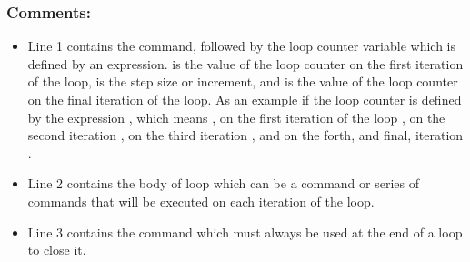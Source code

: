 \subsubsection{Comments:}
\begin{itemize}
\item Line 1 contains the  command, followed by the loop counter variable which is defined by an expression.  is the value of the loop counter on the first iteration of the loop,  is the step size or increment, and  is the value of the loop counter on the final iteration of the loop. As an example if the loop counter is defined by the expression , which means , on the first iteration of the loop , on the second iteration , on the third iteration , and on the forth, and final, iteration .
\item Line 2 contains the body of loop which can be a command or series of commands that will be executed on each iteration of the loop.
\item Line 3 contains the  command which must always be used at the end of a loop to close it.
\end{itemize}
\addtolength{\parindent}{-4mm}
\\
\addtolength{\parindent}{4mm}

